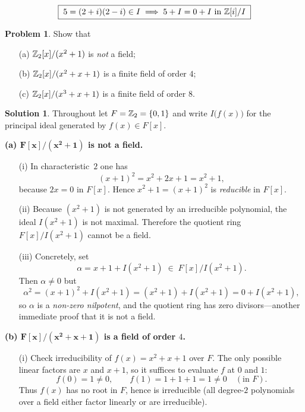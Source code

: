 \documentclass[12pt]{article}
\theoremstyle{definition} %
\newtheorem{solution}{Solution}
\newtheorem{problem}{Problem}
\theoremstyle{plain} %
\begin{document}
\[
\boxed{\;
   5=(2+i)(2-i)\in I
   \;\Longrightarrow\;
   5+I = 0+I \text{ in } \Bbb Z[i]/I
\;}
\]
\begin{problem}
  Show that
  \begin{enumerate}
    \item[\textnormal{(a)}] $\Bbb Z_{2}[x]/(x^{2}+1)$ is \emph{not} a field;
    \item[\textnormal{(b)}] $\Bbb Z_{2}[x]/(x^{2}+x+1)$ is a finite field of order $4$;
    \item[\textnormal{(c)}] $\Bbb Z_{2}[x]/(x^{3}+x+1)$ is a finite field of order $8$.
  \end{enumerate}
\end{problem}

\begin{solution}
Throughout let $F=\Bbb Z_{2}=\{0,1\}$ and write $I\bigl(f(x)\bigr)$ for the
principal ideal generated by $f(x)\in F[x]$.

\bigskip
\textbf{(a) $\boldsymbol{F[x]/(x^{2}+1)}$ is not a field.}

\begin{enumerate}
  \item[(i)]  In characteristic~$2$ one has
              \[
                  (x+1)^{2}=x^{2}+2x+1=x^{2}+1,
              \]
              because $2x=0$ in $F[x]$.  Hence $x^{2}+1=(x+1)^{2}$ is
              \emph{reducible} in $F[x]$.

  \item[(ii)] Because $(x^{2}+1)$ is not generated by an irreducible
              polynomial, the ideal $I(x^{2}+1)$ is not maximal.
              Therefore the quotient ring
              $F[x]/I(x^{2}+1)$ cannot be a field.

  \item[(iii)]  Concretely, set
              \[
                 \alpha = x+1 + I(x^{2}+1)\;\in\;F[x]/I(x^{2}+1).
              \]
              Then
              $\alpha\neq0$ but
              \[
                 \alpha^{2}
                 =(x+1)^{2}+I(x^{2}+1)
                 =(x^{2}+1)+I(x^{2}+1)
                 =0+I(x^{2}+1),
              \]
              so $\alpha$ is a \emph{non-zero nilpotent}, and the quotient
              ring has zero divisors—another immediate proof that it is
              not a field.
\end{enumerate}

\bigskip
\textbf{(b) $\boldsymbol{F[x]/(x^{2}+x+1)}$ is a field of order $4$.}

\begin{enumerate}
  \item[(i)]  Check irreducibility of $f(x)=x^{2}+x+1$ over $F$.
              The only possible linear factors are $x$ and $x+1$, so it
              suffices to evaluate $f$ at $0$ and $1$:
              \[
                 f(0)=1\neq0, 
                 \qquad
                 f(1)=1+1+1=1\neq0
                 \quad(\text{in }F).
              \]
              Thus $f(x)$ has no root in $F$, hence is irreducible
              (all degree-$2$ polynomials over a field either factor
              linearly or are irreducible).


\end{enumerate}
\end{solution}
\end{document}

